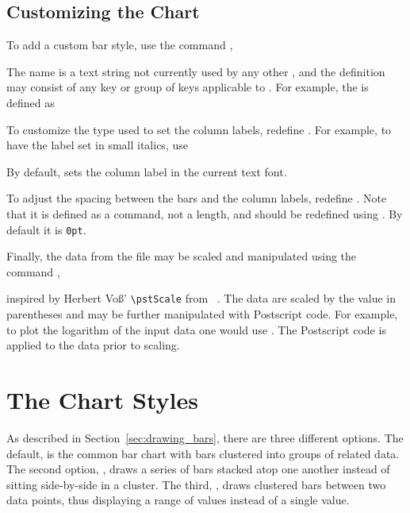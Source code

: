 \documentclass[11pt,english,BCOR=10mm,DIV=14,bibliography=totoc,parskip=false,headings=small,
    headinclude=false,footinclude=false,twoside]{pst-doc}
\begin{document}
\subsection{Customizing the Chart}\label{sec:customizing}%
      To add a custom bar style, use the command ,
\begin{BDef}
\end{BDef}
      The name is a text string not currently used by any other
      , and the definition may consist of any 
      key or group of keys applicable to . For example, the
        is defined as
\begin{BDef}
\end{BDef}

      To customize the type used to set the column labels, redefine
      . For example, to have the label set in small italics,
      use
\begin{BDef}
\Largb{\small\itshape}
\end{BDef}
      By default,  sets the column label in the current text
      font.

      To adjust the spacing between the bars and the column labels, redefine
      . Note that it is defined as a command, not a
      length, and should be redefined using . By default
      it is \verb|0pt|.

      Finally, the data from the file may be scaled and manipulated using the
      command ,
\begin{BDef}
\end{BDef}
      inspired by Herbert Vo\ss' \verb|\pstScale| from
      ~\cite{pstricks-add}. The data are scaled by the value in
      parentheses and may be further manipulated with Postscript code. For
      example, to plot the logarithm of the input data one would use
      . The Postscript code is applied to the data
      prior to scaling.

  \section{The Chart Styles}
    As described in Section~\ref{sec:drawing_bars}, there are three different
     options. The default,  is the common bar
    chart with bars clustered into groups of related data. The second option,
    , draws a series of bars stacked atop one another instead of
    sitting side-by-side in a cluster. The third, , draws clustered
    bars between two data points, thus displaying a range of values instead of
    a single value.
\end{document}

